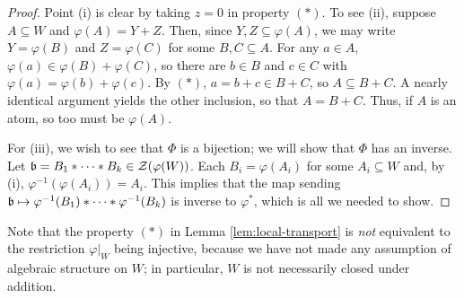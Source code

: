 \begin{proof}
Point (i) is clear by taking $z = 0$ in property $(*)$.
To see (ii), suppose $A\subseteq W$ and $\varphi(A) = Y+Z$.
Then, since $Y,Z\subseteq \varphi(A)$, we may write $Y = \varphi(B)$ and $Z = \varphi(C)$ for some $B,C\subseteq A$.
For any $a\in A$, $\varphi(a) \in \varphi(B) + \varphi(C)$, so there are $b\in B$ and $c\in C$ with $\varphi(a) = \varphi(b) + \varphi(c)$.
By $(*)$, $a = b + c \in B+C$, so $A \subseteq B + C$.
A nearly identical argument yields the other inclusion, so that $A = B+C$.
Thus, if $A$ is an atom, so too must be $\varphi(A)$. 

For (iii), we wish to see that $\Phi$ is a bijection; we will show that $\Phi$ has an inverse.
Let $\mathfrak{b} = B_1 * \cdots * B_k\in \mathcal{Z}(\varphi(W))$.
Each $B_i = \varphi(A_i)$ for some $A_i\subseteq W$ and, by (i), $\varphi^{-1}(\varphi(A_i)) = A_i$.
This implies that the map sending $\mathfrak{b} \mapsto \varphi^{-1}(B_1) * \cdots * \varphi^{-1}(B_k)$ is inverse to $\varphi^*$, which is all we needed to show.
\end{proof}

\begin{rk}
Note that the property $(*)$ in Lemma \ref{lem:local-transport} is \textit{not} equivalent to the restriction $\varphi|_W$ being injective, because we have not made any assumption of algebraic structure on $W$; in particular, $W$ is not necessarily closed under addition. 
\end{rk}

